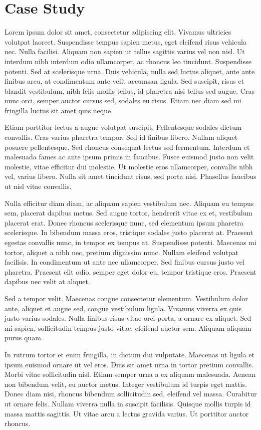 \documentclass[conference]{IEEEtran}
\begin{document}
\section{Case Study}


Lorem ipsum dolor sit amet, consectetur adipiscing elit. Vivamus ultricies volutpat laoreet. Suspendisse tempus sapien metus, eget eleifend risus vehicula nec. Nulla facilisi. Aliquam non sapien ut tellus sagittis varius vel non nisl. Ut interdum nibh interdum odio ullamcorper, ac rhoncus leo tincidunt. Suspendisse potenti. Sed at scelerisque urna. Duis vehicula, nulla sed luctus aliquet, ante ante finibus arcu, at condimentum ante velit accumsan ligula. Sed suscipit, risus et blandit vestibulum, nibh felis mollis tellus, id pharetra nisi tellus sed augue. Cras nunc orci, semper auctor cursus sed, sodales eu risus. Etiam nec diam sed mi fringilla luctus sit amet quis neque.

Etiam porttitor lectus a augue volutpat suscipit. Pellentesque sodales dictum convallis. Cras varius pharetra tempor. Sed id finibus libero. Nullam aliquet posuere pellentesque. Sed rhoncus consequat lectus sed fermentum. Interdum et malesuada fames ac ante ipsum primis in faucibus. Fusce euismod justo non velit molestie, vitae efficitur dui molestie. Ut molestie eros ullamcorper, convallis nibh vel, varius libero. Nulla sit amet tincidunt risus, sed porta nisi. Phasellus faucibus ut nisl vitae convallis.

Nulla efficitur diam diam, ac aliquam sapien vestibulum nec. Aliquam eu tempus sem, placerat dapibus metus. Sed augue tortor, hendrerit vitae ex et, vestibulum placerat erat. Donec rhoncus scelerisque nunc, sed elementum ipsum pharetra scelerisque. In bibendum massa eros, tristique sodales justo placerat at. Praesent egestas convallis nunc, in tempor ex tempus at. Suspendisse potenti. Maecenas mi tortor, aliquet a nibh nec, pretium dignissim nunc. Nullam eleifend volutpat facilisis. In condimentum ut ante nec ullamcorper. Sed finibus cursus justo vel pharetra. Praesent elit odio, semper eget dolor eu, tempor tristique eros. Praesent dapibus nec velit at aliquet.

Sed a tempor velit. Maecenas congue consectetur elementum. Vestibulum dolor ante, aliquet et augue sed, congue vestibulum ligula. Vivamus viverra ex quis justo varius sodales. Nulla finibus risus vitae orci porta, a ornare ex aliquet. Sed mi sapien, sollicitudin tempus justo vitae, eleifend auctor sem. Aliquam aliquam purus quam.

In rutrum tortor et enim fringilla, in dictum dui vulputate. Maecenas ut ligula et ipsum euismod ornare ut vel eros. Duis sit amet urna in tortor pretium convallis. Morbi vitae sollicitudin nisl. Etiam semper urna a ex aliquam malesuada. Aenean non bibendum velit, eu auctor metus. Integer vestibulum id turpis eget mattis. Donec diam nisi, rhoncus bibendum sollicitudin sed, eleifend vel massa. Curabitur ut ornare felis. Nullam viverra nulla in suscipit facilisis. Quisque mollis turpis id massa mattis sagittis. Ut vitae arcu a lectus gravida varius. Ut porttitor auctor rhoncus.
\end{document}
